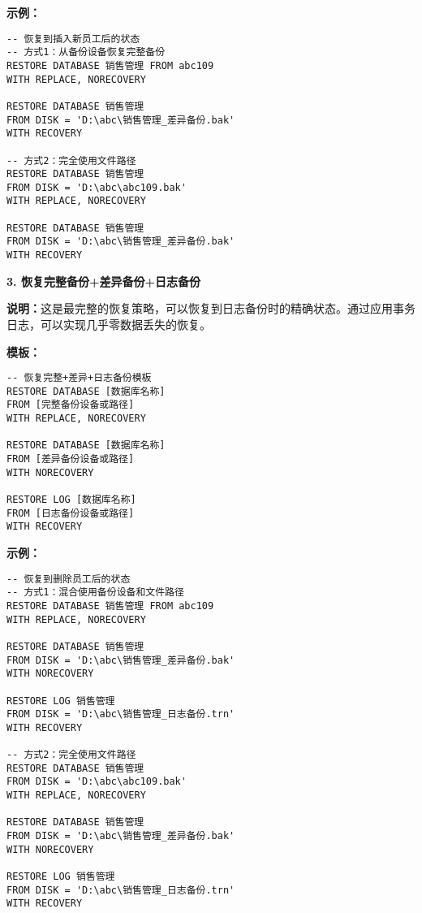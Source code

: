 \qquad \textbf{示例：}
\begin{mdframed}[backgroundcolor=blue!5]
\begin{verbatim}
-- 恢复到插入新员工后的状态
-- 方式1：从备份设备恢复完整备份
RESTORE DATABASE 销售管理 FROM abc109
WITH REPLACE, NORECOVERY

RESTORE DATABASE 销售管理
FROM DISK = 'D:\abc\销售管理_差异备份.bak'
WITH RECOVERY

-- 方式2：完全使用文件路径
RESTORE DATABASE 销售管理
FROM DISK = 'D:\abc\abc109.bak'
WITH REPLACE, NORECOVERY

RESTORE DATABASE 销售管理
FROM DISK = 'D:\abc\销售管理_差异备份.bak'
WITH RECOVERY
\end{verbatim}
\end{mdframed}

\textbf{3. 恢复完整备份+差异备份+日志备份}

\qquad \textbf{说明：}这是最完整的恢复策略，可以恢复到日志备份时的精确状态。通过应用事务日志，可以实现几乎零数据丢失的恢复。

\qquad \textbf{模板：}
\begin{mdframed}[backgroundcolor=gray!10]
\begin{verbatim}
-- 恢复完整+差异+日志备份模板
RESTORE DATABASE [数据库名称]
FROM [完整备份设备或路径]
WITH REPLACE, NORECOVERY

RESTORE DATABASE [数据库名称]
FROM [差异备份设备或路径]
WITH NORECOVERY

RESTORE LOG [数据库名称]
FROM [日志备份设备或路径]
WITH RECOVERY
\end{verbatim}
\end{mdframed}

\qquad \textbf{示例：}
\begin{mdframed}[backgroundcolor=blue!5]
\begin{verbatim}
-- 恢复到删除员工后的状态
-- 方式1：混合使用备份设备和文件路径
RESTORE DATABASE 销售管理 FROM abc109
WITH REPLACE, NORECOVERY

RESTORE DATABASE 销售管理
FROM DISK = 'D:\abc\销售管理_差异备份.bak'
WITH NORECOVERY

RESTORE LOG 销售管理
FROM DISK = 'D:\abc\销售管理_日志备份.trn'
WITH RECOVERY

-- 方式2：完全使用文件路径
RESTORE DATABASE 销售管理
FROM DISK = 'D:\abc\abc109.bak'
WITH REPLACE, NORECOVERY

RESTORE DATABASE 销售管理
FROM DISK = 'D:\abc\销售管理_差异备份.bak'
WITH NORECOVERY

RESTORE LOG 销售管理
FROM DISK = 'D:\abc\销售管理_日志备份.trn'
WITH RECOVERY
\end{verbatim}
\end{mdframed}

